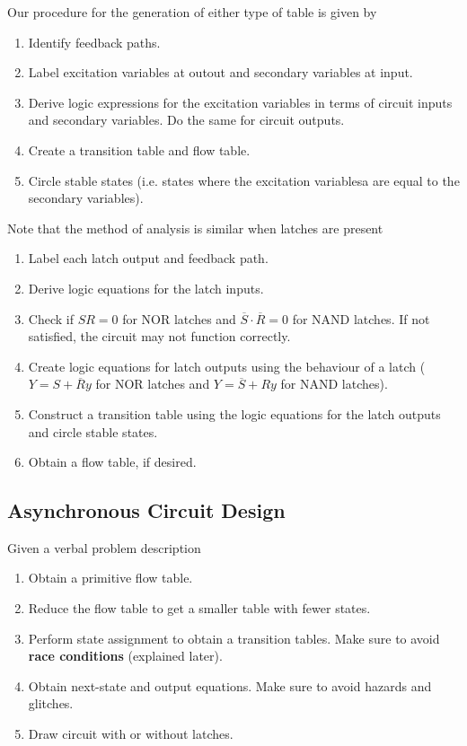 \documentclass[12pt]{article}
\begin{document}
Our procedure for the generation of either type of table is given by
\begin{enumerate}
\item Identify feedback paths.
\item Label excitation variables at outout and secondary variables at input.
\item Derive logic expressions for the excitation variables in terms of circuit inputs and secondary variables. Do the same for circuit outputs.
\item Create a transition table and flow table.
\item Circle stable states (i.e. states where the excitation variablesa are equal to the secondary variables).
\end{enumerate}

Note that the method of analysis is similar when latches are present
\begin{enumerate}
\item Label each latch output and feedback path.
\item Derive logic equations for the latch inputs.
\item Check if $SR=0$ for NOR latches and $\overline{S}\cdot\overline{R} = 0$ for NAND latches. If not satisfied, the circuit may not function correctly.
\item Create logic equations for latch outputs using the behaviour of a latch ($Y=S+\overline{R}y$ for NOR latches and $Y = \overline{S} + Ry$ for NAND latches).
\item Construct a transition table using the logic equations for the latch outputs and circle stable states.
\item Obtain a flow table, if desired.
\end{enumerate}

\subsection*{Asynchronous Circuit Design}
Given a verbal problem description
\begin{enumerate}
\item Obtain a primitive flow table.
\item Reduce the flow table to get a smaller table with fewer states.
\item Perform state assignment to obtain a transition tables. Make sure to avoid {\bf race conditions} (explained later).
\item Obtain next-state and output equations. Make sure to avoid hazards and glitches.
\item Draw circuit with or without latches.
\end{enumerate}
\end{document}
